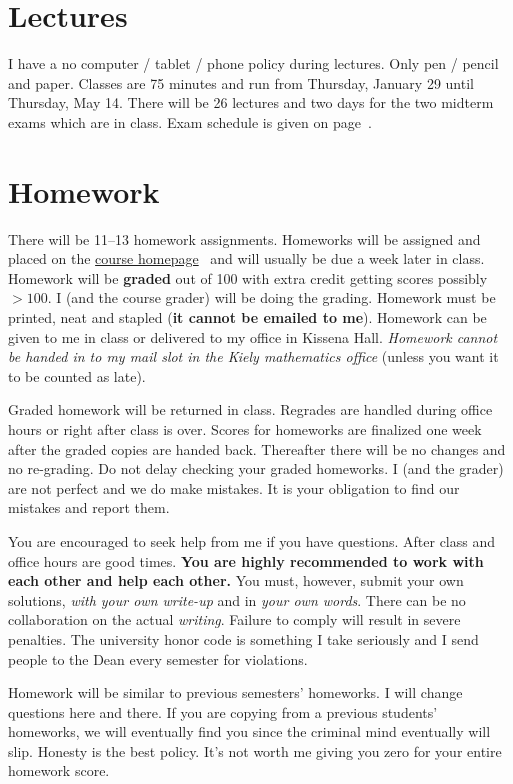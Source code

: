 \documentclass[12pt]{article}
\newcommand{\ingreen}[1]{\color{green}\textbf{#1} \color{black}}
\newcommand{\coursewebpage}{\href{https://github.com/kapelner/QC_Math_241_Spring_2015}{course homepage}}
\begin{document}
\section*{Lectures}

I have a no computer / tablet / phone policy during lectures. Only pen / pencil and paper. Classes are 75 minutes and run from Thursday, January 29 until Thursday, May 14. There will be 26 lectures and two days for the two midterm exams which are in class. Exam schedule is given on page~\pageref{subsec:exam_schedule}.


\section*{Homework}

There will be 11--13 homework assignments. Homeworks will be assigned and placed on the \coursewebpage~ and will usually be due a week later in class. Homework will be \textbf{graded} out of 100 with extra credit getting scores possibly $> 100$. I (and the course grader) will be doing the grading. Homework must be printed, neat and stapled (\textbf{it cannot be emailed to me}). Homework can be given to me in class or delivered to my office in Kissena Hall. \textit{Homework cannot be handed in to my mail slot in the Kiely mathematics office} (unless you want it to be counted as late).

Graded homework will be returned in class. Regrades are handled during office hours or right after class is over. Scores for homeworks are finalized one week after the graded copies are handed back. Thereafter there will be no changes and no re-grading. Do not delay checking your graded homeworks. I (and the grader) are not perfect and we do make mistakes. It is your obligation to find our mistakes and report them.

You are encouraged to seek help from me if you have questions. After class and office hours are good times. \ingreen{You are highly recommended to work with each other and help each other.} You must, however, submit your own solutions, \textit{with your own write-up} and in \textit{your own words}. There can be no collaboration on the actual \textit{writing}. Failure to comply will result in severe penalties. The university honor code is something I take seriously and I send people to the Dean every semester for violations.

Homework will be similar to previous semesters' homeworks. I will change questions here and there. If you are copying from a previous students' homeworks, we will eventually find you since the criminal mind eventually will slip. Honesty is the best policy. It's not worth me giving you zero for your entire homework score.
\end{document}
